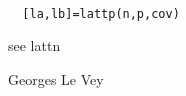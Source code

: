 
\begin{mandesc}
   \\ %
\end{mandesc}
\begin{calling_sequence}
\begin{verbatim}
  [la,lb]=lattp(n,p,cov)  
\end{verbatim}
\end{calling_sequence}
\begin{mandescription}
  see lattn
\end{mandescription}
\begin{authors}
  Georges Le Vey
\end{authors}

